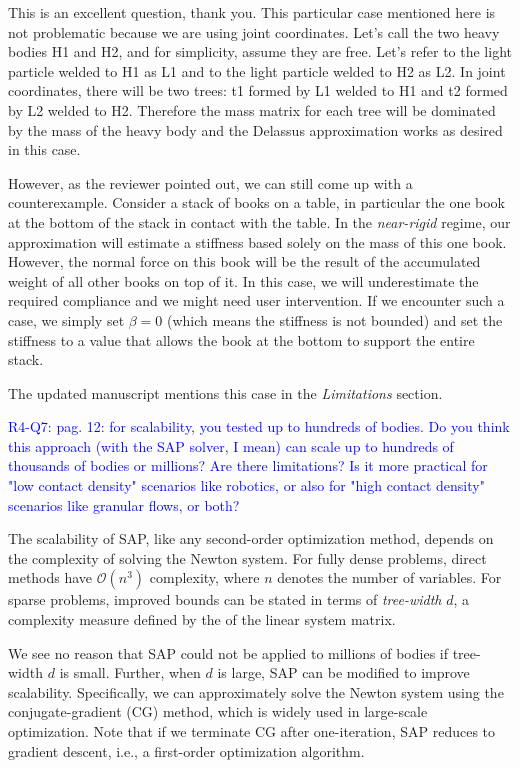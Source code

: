 This is an excellent question, thank you. This particular case mentioned here is
not problematic because we are using joint coordinates. Let's call the two heavy
bodies H1 and H2, and for simplicity, assume they are free. Let's refer to the
light particle welded to H1 as L1 and to the light particle welded to H2 as L2.
In joint coordinates, there will be two trees: t1 formed by L1 welded to H1 and
t2 formed by L2 welded to H2. Therefore the mass matrix for each tree will be
dominated by the mass of the heavy body and the Delassus approximation works
as desired in this case.

However, as the reviewer pointed out, we can still come up with a
counterexample. Consider a stack of books on a table, in particular the one book
at the bottom of the stack in contact with the table. In the \emph{near-rigid}
regime, our approximation will estimate a stiffness based solely on the mass of
this one book. However, the normal force on this book will be the result of the
accumulated weight of all other books on top of it. In this case, we will
underestimate the required compliance and we might need user intervention. 
If we encounter such a case, we simply set $\beta=0$ (which means
the stiffness is not bounded) and set the stiffness to a value that allows the
book at the bottom to support the entire stack.

The updated manuscript mentions this case in the \emph{Limitations} section.

\vspace{5mm}
\textcolor{blue}{R4-Q7: pag. 12: for scalability, you tested up to hundreds of
bodies. Do you think this approach (with the SAP solver, I mean) can scale up to
hundreds of thousands of bodies or millions? Are there limitations? Is it more
practical for "low contact density" scenarios like robotics, or also for "high
contact density" scenarios like granular flows, or both?}

The scalability of SAP, like any second-order optimization method, depends on
the complexity of solving the Newton system. For fully dense problems,
direct methods have $\mathcal{O}(n^3)$ complexity, where $n$
denotes the number of variables.  For sparse problems, improved bounds can be
stated in terms of \emph{tree-width} $d$, a complexity measure defined by the
\cite{chordal-extensions} of the linear system matrix.

We see no reason that SAP could not be applied to millions of bodies if
tree-width $d$ is small.  Further, when $d$ is large, SAP can be modified to improve
scalability.  Specifically, we can approximately solve the Newton system using
the conjugate-gradient (CG) method, which is widely used in large-scale
optimization.  Note that if we terminate CG after one-iteration, SAP reduces to
gradient descent, i.e., a first-order optimization algorithm. 


